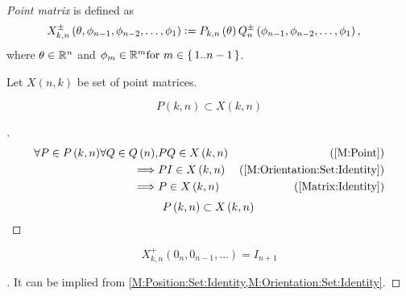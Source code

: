 \documentclass[stu, babel, american, biblatex, a4paper, leqno, draftall]{apa7}
\begin{document}
\begin{definition}\label{M:Point}
    \textit{Point matrix} is defined as
    \begin{align*}
        X^\pm_{k,n}\left(\theta,\phi_{n-1},\phi_{n-2},\dots,\phi_1\right) & \vcentcolon=
        P_{k,n}\left(\theta\right)
        Q^\pm_n\left(\phi_{n-1},\phi_{n-2},\dots,\phi_1\right)\text{,}
    \end{align*}
    where $\theta\in\mathbb{R}^n$ and $\phi_m\in\mathbb{R}^m \text{for } m\in\set{1..n-1}$.
\end{definition}
\begin{definition}\label{M:Point:Set}
    Let $X\left(n,k\right)$ be set of point matrices.
\end{definition}
\begin{corollary}\label{M:Point:Position}
    \begin{equation*}
        P\left(k,n\right)\subset X\left(k,n\right)
    \end{equation*}
\end{corollary}
\begin{proof}[]
    \begin{align*}
    	\forall{P \in P\left(k,n\right)}
    	\forall{Q\in Q\left(n\right)},
    	&
    	P Q \in X\left(k,n\right) & \text{(\cref{M:Point})} \\
    	\implies &
    	P I \in X\left(k,n\right) & \text{(\cref{M:Orientation:Set:Identity})} \\
    	\implies &
    	P \in X\left(k,n\right) & \text{(\cref{Matrix:Identity})} 
    \end{align*}
    \begin{equation*}
    	P\left(k,n\right)\subset X\left(k,n\right) \qedhere
    \end{equation*}
\end{proof}
\begin{corollary}\label{M:Point:Set:Identity}
    \begin{equation*}
    	X^{+}_{k,n}
    	\left(0_{n}, 0_{n-1}, \dots\right)
    	=
    	I_{n+1}
    \end{equation*}
\end{corollary}
\begin{proof}[]
	It can be implied from \cref{M:Position:Set:Identity,M:Orientation:Set:Identity}.
\end{proof}
\end{document}
